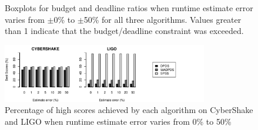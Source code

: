 \documentclass[preprint,5p]{elsarticle}
\begin{document}
\begin{figure}[htb]
    \centering
    \hspace{2cm}
    \caption{Boxplots for budget and deadline ratios when runtime estimate 
    error varies from $\pm$0\% to $\pm$50\% for all three algorithms. Values 
    greater than 1 indicate that the budget/deadline constraint was exceeded.}
    \label{fig:variances}
\end{figure}
\begin{figure}[htb]
    \centering
        \includegraphics[width=0.8\textwidth]{run-finish-variations-test-0-output-distributions-variances}
    \caption{\label{fig:variances-scores}Percentage of high scores achieved by each algorithm on 
    CyberShake and LIGO when runtime estimate error varies from 0\% to 50\%}
\end{figure}
\end{document}
